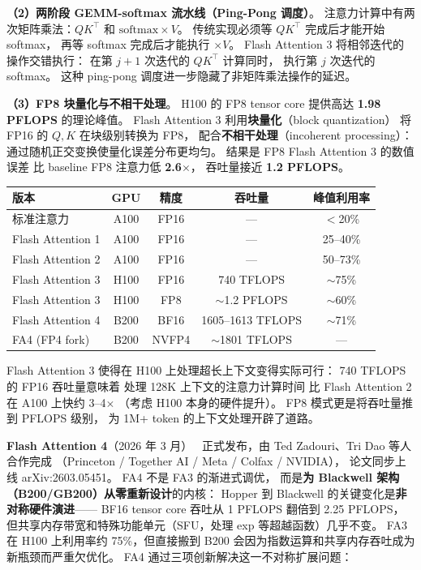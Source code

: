 \textbf{（2）两阶段 GEMM-softmax 流水线（Ping-Pong 调度）}。
注意力计算中有两次矩阵乘法：$QK^\top$ 和 $\mathrm{softmax} \times V$。
传统实现必须等 $QK^\top$ 完成后才能开始 softmax，
再等 softmax 完成后才能执行 $\times V$。
Flash Attention 3 将相邻迭代的操作交错执行：
在第 $j+1$ 次迭代的 $QK^\top$ 计算同时，
执行第 $j$ 次迭代的 softmax。
这种 ping-pong 调度进一步隐藏了非矩阵乘法操作的延迟。

\textbf{（3）FP8 块量化与不相干处理}。
H100 的 FP8 tensor core 提供高达 \textbf{1.98 PFLOPS} 的理论峰值。
Flash Attention 3 利用\textbf{块量化}（block quantization）
将 FP16 的 $Q, K$ 在块级别转换为 FP8，
配合\textbf{不相干处理}（incoherent processing）：
通过随机正交变换使量化误差分布更均匀。
结果是 FP8 Flash Attention 3 的数值误差
比 baseline FP8 注意力低 \textbf{2.6$\times$}，
吞吐量接近 \textbf{1.2 PFLOPS}。

\begin{center}\small
\renewcommand{\arraystretch}{1.3}
\begin{tabular}{lcccc}
\toprule
\rowcolor{figLightGray}
\textbf{版本} & \textbf{GPU} & \textbf{精度} & \textbf{吞吐量} & \textbf{峰值利用率} \\
\midrule
标准注意力 & A100 & FP16 & --- & $<$20\% \\
Flash Attention 1 & A100 & FP16 & --- & 25--40\% \\
Flash Attention 2 & A100 & FP16 & --- & 50--73\% \\
Flash Attention 3 & H100 & FP16 & 740 TFLOPS & $\sim$75\% \\
Flash Attention 3 & H100 & FP8 & $\sim$1.2 PFLOPS & $\sim$60\% \\
Flash Attention 4 & B200 & BF16 & 1605--1613 TFLOPS & $\sim$71\% \\
FA4 (FP4 fork) & B200 & NVFP4 & $\sim$1801 TFLOPS & --- \\
\bottomrule
\end{tabular}
\end{center}

Flash Attention 3 使得在 H100 上处理超长上下文变得实际可行：
740 TFLOPS 的 FP16 吞吐量意味着
处理 128K 上下文的注意力计算时间
比 Flash Attention 2 在 A100 上快约 3--4$\times$
（考虑 H100 本身的硬件提升）。
FP8 模式更是将吞吐量推到 PFLOPS 级别，
为 1M+ token 的上下文处理开辟了道路。

\textbf{Flash Attention 4}（2026 年 3 月）~\cite{flashattention4}
正式发布，由 Ted Zadouri、Tri Dao 等人合作完成
（Princeton / Together AI / Meta / Colfax / NVIDIA），
论文同步上线 arXiv:2603.05451。
FA4 不是 FA3 的渐进式调优，
而是\textbf{为 Blackwell 架构（B200/GB200）从零重新设计}的内核：
Hopper 到 Blackwell 的关键变化是\textbf{非对称硬件演进}——
BF16 tensor core 吞吐从 1 PFLOPS 翻倍到 2.25 PFLOPS，
但共享内存带宽和特殊功能单元（SFU，处理 exp 等超越函数）几乎不变。
FA3 在 H100 上利用率约 75\%，但直接搬到 B200
会因为指数运算和共享内存吞吐成为新瓶颈而严重欠优化。
FA4 通过三项创新解决这一不对称扩展问题：

